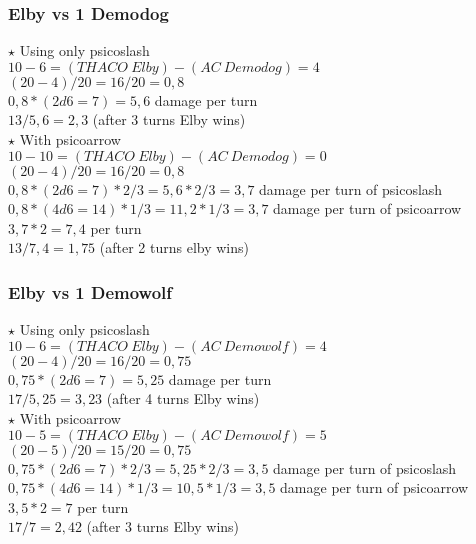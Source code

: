 \subsubsection*{Elby vs 1 Demodog}

$\star$ Using only psicoslash\\
$10-6 = (THACO\:Elby) - (AC\:Demodog) = 4$\\
$(20-4)/20 = 16/20 = 0,8$\\
$0,8 * (2d6 = 7) = 5,6$ damage per turn\\
$13 / 5,6 = 2,3$ (after 3 turns Elby wins)\\
\newline
$\star$ With psicoarrow\\
$10-10 = (THACO\:Elby) - (AC\:Demodog) = 0$\\
$(20-4)/20 = 16/20 = 0,8$\\
$0,8 * (2d6 = 7) * 2/3  = 5,6 * 2/3 = 3,7$ damage per turn of psicoslash\\
$0,8 * (4d6 = 14) * 1/3 = 11,2 * 1/3 = 3,7$ damage per turn of psicoarrow\\
$3,7 * 2= 7,4$ per turn\\
$13 / 7,4 = 1,75$ (after 2 turns elby wins)\\

\subsubsection*{Elby vs 1 Demowolf}

$\star$ Using only psicoslash\\
$10-6 = (THACO\:Elby) - (AC\:Demowolf) = 4$\\
$(20-4)/20 = 16/20 = 0,75$\\
$0,75 * (2d6 = 7) = 5,25$ damage per turn\\
$17 / 5,25 = 3,23$ (after 4 turns Elby wins)\\
\newline
$\star$ With psicoarrow\\
$10-5 = (THACO\:Elby) - (AC\:Demowolf) = 5$\\
$(20-5)/20 = 15/20 = 0,75$\\
$0,75 * (2d6 = 7) * 2/3  = 5,25 * 2/3 = 3,5$ damage per turn of psicoslash\\
$0,75 * (4d6 = 14) * 1/3 = 10,5 * 1/3 = 3,5$ damage per turn of psicoarrow\\
$3,5 * 2= 7$ per turn\\
$17 / 7 = 2,42$ (after 3 turns Elby wins)\\


